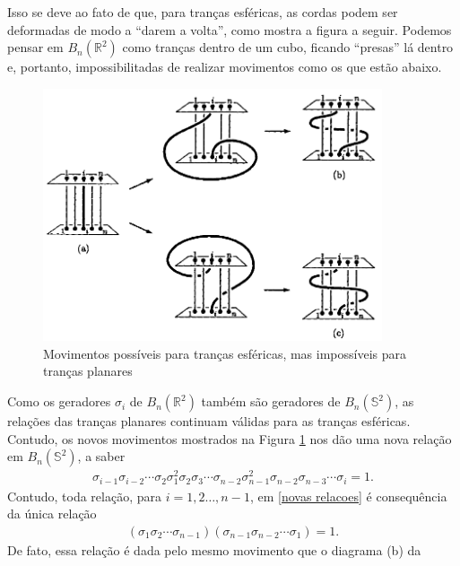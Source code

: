 	\par\vspace{0.3cm} Isso se deve ao fato de que, para tranças esféricas, as cordas 
	podem ser deformadas de modo a ``darem a volta'', como mostra a figura a seguir. 
	Podemos pensar em $B_n(\mathbb{R}^2)$ como tranças dentro de um cubo, ficando ``presas'' 
	lá dentro e, portanto, impossibilitadas de realizar movimentos como os que estão abaixo.
	\begin{figure}[H]
		\begin{center}
			\includegraphics[width=10cm]{Images/movimentos_trancas_esfericas.png}
		\end{center}\caption{Movimentos possíveis para tranças esféricas, mas impossíveis para tranças planares}
		\label{movimentos trancas esfericas}
	\end{figure} 
	Como os geradores $\sigma_i$ de $B_n(\mathbb{R}^2)$ também são geradores de $B_n(\mathbb{S}^2)$, 
	as relações das tranças planares continuam válidas para as tranças esféricas. 
	Contudo, os novos movimentos mostrados na Figura \ref{movimentos trancas esfericas} 
	nos dão uma nova relação em $B_n(\mathbb{S}^2)$, a saber
	\begin{align}
	\label{novas relacoes}
	    \sigma_{i-1}\sigma_{i-2}
	    \cdots\sigma_2\sigma_1^2\sigma_2\sigma_3
	    \cdots\sigma_{n-2}\sigma_{n-1}^2\sigma_{n-2}\sigma_{n-3}
	    \cdots\sigma_i = 1.
	\end{align}
	Contudo, toda relação, para $i=1,2\dots,n-1$, em \eqref{novas relacoes} é consequência da 
	única relação
	\begin{align}
	\label{nova relacao}
	    (\sigma_1\sigma_2\cdots\sigma_{n-1})(\sigma_{n-1}\sigma_{n-2}\cdots\sigma_1) = 1.
	\end{align}
	De fato, essa relação é dada pelo mesmo movimento que o diagrama (b) da 
